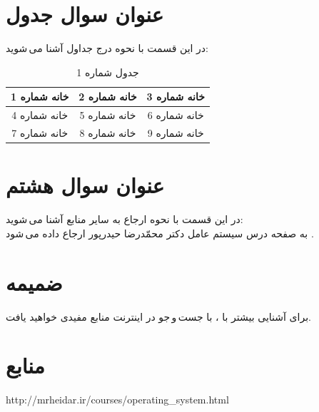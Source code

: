 \documentclass{article}
\begin{document}
\section{عنوان سوال جدول}
در این قسمت با نحوه درج جداول آشنا می\,شوید:
\begin{table}[ht]
    \centering
    \begin{tabular}{|c|c|c|}
    \hline
    خانه شماره 1 & خانه شماره 2 & خانه شماره 3\\
    \hline
    خانه شماره 4 & خانه شماره 5 & خانه شماره 6\\
    \hline
    خانه شماره 7 & خانه شماره 8 & خانه شماره 9\\
    \hline
    \end{tabular}
    \caption{جدول شماره 1}
    \label{tab:tab1}
\end{table}



\section{عنوان سوال هشتم}
در این قسمت با نحوه ارجاع به سایر منابع آشنا می\,شوید:\\
\indent
به صفحه درس سیستم عامل دکتر محمّدرضا حیدرپور ارجاع داده می\,شود \cite{b1}.

\section{ضمیمه}
برای آشنایی بیشتر با \lr{\LaTeX}، با جست\,و\,جو در اینترنت منابع مفیدی خواهید یافت.


\section*{منابع}
\renewcommand{\section}[2]{}%
\begin{thebibliography}{99} %


\begin{LTRitems}

\resetlatinfont

 http://mrheidar.ir/courses/operating\_system.html
\end{LTRitems}

\end{thebibliography}
\end{document}
